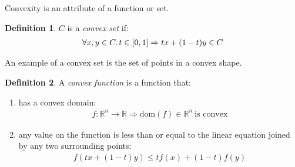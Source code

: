 \documentclass[12pt]{article}
\newcommand{\RR}{\mathbb{R}}
\newcommand{\dom}{\text{dom}}
\theoremstyle{definition}
\newtheorem{defn}{Definition}[section]
\begin{document}
	Convexity is an attribute of a function or set.
	
	\begin{defn}
		$C$ is a \emph{convex set} if:
		\begin{gather*}
			\forall x, y \in C\ldotp t \in [0, 1] \Rightarrow tx + (1-t) y \in C
		\end{gather*}
	\end{defn}
	
	An example of a convex set is the set of points in a convex shape.
	
	\begin{defn}
		A \emph{convex function} is a function that:
		\begin{enumerate}
			\item has a convex domain:
			\begin{gather*}
				f: \RR^n \to \RR \Rightarrow \dom(f) \in \RR^n\ \text{is convex}
			\end{gather*}
			\item any value on the function is less than or equal to the linear equation joined by any two surrounding points:
			\begin{gather*}
				f(tx + (1 - t)y) \le tf(x) + (1 - t)f(y)
			\end{gather*}
		\end{enumerate}
	\end{defn}
	
\end{document}

